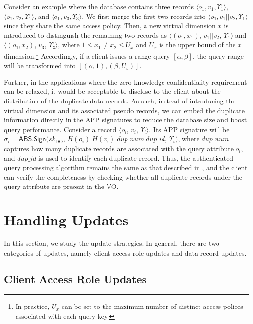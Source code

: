 Consider an example where the database contains three records $\langle o_1, v_1, \Upsilon_1\rangle$, $\langle o_1, v_2, \Upsilon_1\rangle$, and $\langle o_1, v_3, \Upsilon_3\rangle$. We first merge the first two records into $\langle o_1, v_1 || v_2, \Upsilon_1\rangle$ since they share the same access policy. Then, a new virtual dimension $x$ is introduced to distinguish the remaining two records as $\langle (o_1, x_1)$, $v_1 || v_2$, $\Upsilon_1\rangle$ and $\langle (o_1, x_2)$, $v_3$, $\Upsilon_3\rangle$, where $1 \leq x_1 \neq x_2 \leq U_x$ and $U_x$ is the upper bound of the $x$ dimension.\footnote{In practice, $U_x$ can be set to the maximum number of distinct access polices associated with each query key.}  Accordingly, if a client issues a range query $[\alpha, \beta]$, the query range will be transformed into $[(\alpha, 1), (\beta, U_x)]$.

Further, in the applications where the zero-knowledge confidentiality requirement can be relaxed, it would be acceptable to disclose to the client about the distribution of the duplicate data records. As such, instead of introducing the virtual dimension and its associated pseudo records, we can embed the duplicate information directly in the APP signatures to reduce the database size and boost query performance. Consider a record $\langle o_i$, $v_i$, $\Upsilon_i\rangle$. Its APP signature will be $\sigma_i = \textsf{ABS.Sign}({sk}_{\textrm{DO}}$, $H(o_i) | H(v_i) | dup\_num | dup\_id $, $\Upsilon_i)$, where $dup\_num$ captures how many duplicate records are associated with the query attribute $o_i$, and $dup\_id$ is used to identify each duplicate record. Thus, the authenticated query processing algorithm remains the same as that described in , and the client can verify the completeness by checking whether all duplicate records under the query attribute are present in the VO\@.

\section{Handling Updates}\label{sec:access-control:update}

In this section, we study the update strategies. In general, there are two categories of updates, namely client access role updates and data record updates.

\subsection{Client Access Role Updates}

